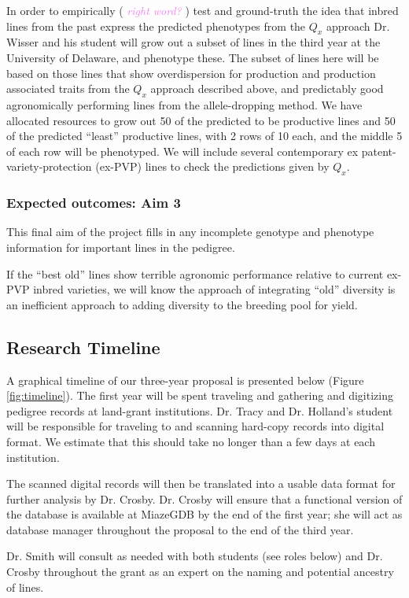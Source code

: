 \documentclass[12pt]{article}
\newcommand{\kc}[1]{\textcolor{violet}{ \emph{\scriptsize  #1}} }
\begin{document}
In order to empirically (\kc{right word?}) test and ground-truth the idea that inbred lines from the past express the predicted phenotypes from the $Q_{x}$ approach Dr. Wisser and his student will grow out a subset of lines in the third year at the University of Delaware, and phenotype these.
The subset of lines here will be based on those lines that show overdispersion for production and production associated traits from the $Q_{x}$ approach described above, and predictably good agronomically performing lines from the allele-dropping method. 
We have allocated resources to grow out 50 of the predicted to be productive lines and 50 of the predicted ``least'' productive lines, with 2 rows of 10 each, and the middle 5 of each row will be phenotyped. 
We will include several contemporary ex patent-variety-protection (ex-PVP) lines to check the predictions given by $Q_{x}$.


\subsubsection*{Expected outcomes: Aim 3}
This final aim of the project fills in any incomplete genotype and phenotype information for important lines in the pedigree. 

If the ``best old'' lines show terrible agronomic performance relative to current ex-PVP inbred varieties, we will know the approach of integrating ``old'' diversity is an inefficient approach to adding diversity to the breeding pool for yield. 

\subsection*{Research Timeline}
A graphical timeline of our three-year proposal is presented below (Figure \ref{fig:timeline}).
The first year will be spent traveling and gathering and digitizing pedigree records at land-grant institutions.
Dr. Tracy and Dr. Holland's  student will be responsible for traveling to and scanning hard-copy records into digital format.  We estimate that this should take no longer than a few days at each institution.

The scanned digital records will then be translated into a usable data format for further analysis by Dr. Crosby.  Dr. Crosby will ensure that a functional version of the database is available at MiazeGDB by the end of the first year; she will act as database manager throughout the proposal to the end of the third year.

Dr. Smith will consult as needed with both students (see roles below) and Dr. Crosby throughout the grant as an expert on the naming and potential ancestry of lines.
\end{document}
